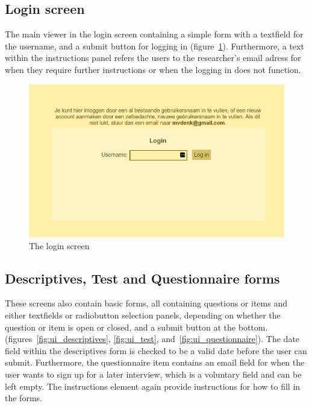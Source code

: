 \subsection{Login screen}

The main viewer in the login screen containing a simple form with a textfield for the username, and a submit button for logging in (figure~\ref{fig:ui_login}). Furthermore, a text within the instructions panel refers the users to the researcher's email adress for when they require further instructions or when the logging in does not function.

\begin{figure}
    \centering
    \includegraphics[width=.8\textwidth]{img/ui_login.png}
    \caption{The login screen}
    \label{fig:ui_login}
\end{figure}

\subsection{Descriptives, Test and Questionnaire forms}

These screens also contain basic forms, all containing questions or items and either textfields or radiobutton selection panels, depending on whether the question or item is open or closed, and a submit button at the bottom. (figures~\ref{fig:ui_descriptives}, \ref{fig:ui_test}, and~\ref{fig:ui_questionnaire}). The date field within the descriptives form is checked to be a valid date before the user can submit. Furthermore, the questionnaire item contains an email field for when the user wants to sign up for a later interview, which is a voluntary field and can be left empty. The instructions element again provide instructions for how to fill in the forms.

